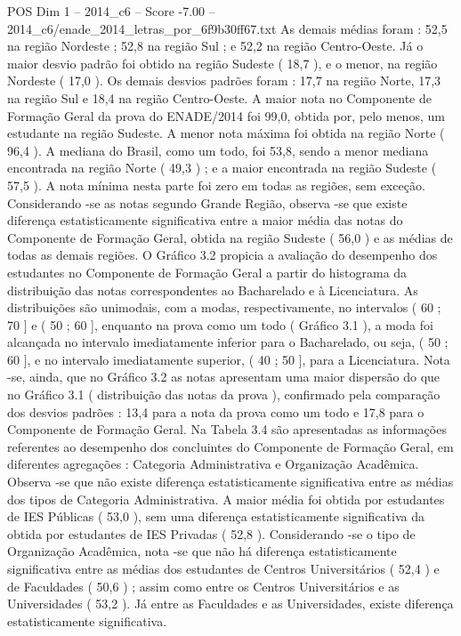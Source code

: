 \begin{textsample}{POS Dim 1 – 2014\_c6 – Score -7.00 – 2014\_c6/enade\_2014\_letras\_por\_6f9b30ff67.txt}
As demais médias foram : 52,5 na região Nordeste ; 52,8 na região Sul ; e 52,2 na região Centro-Oeste.
Já o maior desvio padrão foi obtido na região Sudeste ( 18,7 ), e o menor, na região Nordeste ( 17,0 ).
Os demais desvios padrões foram : 17,7 na região Norte, 17,3 na região Sul e 18,4 na região Centro-Oeste.
A maior nota no Componente de Formação Geral da prova do ENADE/2014 foi 99,0, obtida por, pelo menos, um estudante na região Sudeste.
A menor nota máxima foi obtida na região Norte ( 96,4 ).
A mediana do Brasil, como um todo, foi 53,8, sendo a menor mediana encontrada na região Norte ( 49,3 ) ; e a maior encontrada na região Sudeste ( 57,5 ).
A nota mínima nesta parte foi zero em todas as regiões, sem exceção.
Considerando -se as notas segundo Grande Região, observa -se que existe diferença estatisticamente significativa entre a maior média das notas do Componente de Formação Geral, obtida na região Sudeste ( 56,0 ) e as médias de todas as demais regiões.
O Gráfico 3.2 propicia a avaliação do desempenho dos estudantes no Componente de Formação Geral a partir do histograma da distribuição das notas correspondentes ao Bacharelado e à Licenciatura.
As distribuições são unimodais, com a modas, respectivamente, no intervalos ( 60 ; 70 ] e ( 50 ; 60 ], enquanto na prova como um todo ( Gráfico 3.1 ), a moda foi alcançada no intervalo imediatamente inferior para o Bacharelado, ou seja, ( 50 ; 60 ], e no intervalo imediatamente superior, ( 40 ; 50 ], para a Licenciatura.
Nota -se, ainda, que no Gráfico 3.2 as notas apresentam uma maior dispersão do que no Gráfico 3.1 ( distribuição das notas da prova ), confirmado pela comparação dos desvios padrões : 13,4 para a nota da prova como um todo e 17,8 para o Componente de Formação Geral.
Na Tabela 3.4 são apresentadas as informações referentes ao desempenho dos concluintes do Componente de Formação Geral, em diferentes agregações : Categoria Administrativa e Organização Acadêmica.
Observa -se que não existe diferença estatisticamente significativa entre as médias dos tipos de Categoria Administrativa.
A maior média foi obtida por estudantes de IES Públicas ( 53,0 ), sem uma diferença estatisticamente significativa da obtida por estudantes de IES Privadas ( 52,8 ).
Considerando -se o tipo de Organização Acadêmica, nota -se que não há diferença estatisticamente significativa entre as médias dos estudantes de Centros Universitários ( 52,4 ) e de Faculdades ( 50,6 ) ; assim como entre os Centros Universitários e as Universidades ( 53,2 ).
Já entre as Faculdades e as Universidades, existe diferença estatisticamente significativa.

\end{textsample}
